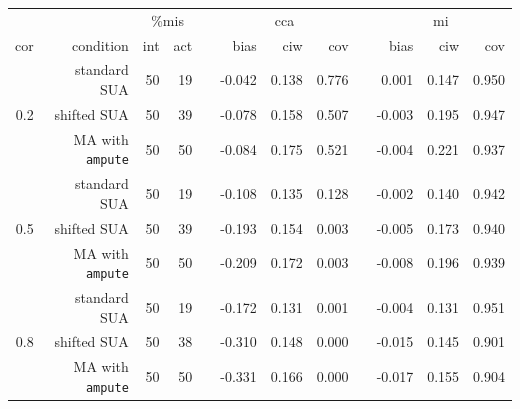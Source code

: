 \documentclass[11pt,a4paper]{article}
\newcommand{\code}[1]{\texttt{#1}}
\begin{document}
\begin{table}[h!]
\bigskip
\begin{subtable}{1\textwidth}
\centering
\captionsetup{justification=justified,singlelinecheck=false,width = 0.93\textwidth}
  \label{sim2c}
\begin{tabular}{rrrrrrrrrrrr}
  \hline
&& \multicolumn{2}{c}{\%mis} && \multicolumn{3}{c}{cca} && \multicolumn{3}{c}{mi} \\
\cline{3-4} \cline{6-8} \cline{10-12}
cor & condition & int & act & & bias & ciw & cov & & bias & ciw & cov \\ 
\hline
 & standard SUA & 50 & 19 &  & -0.042 & 0.138 & 0.776 &  & 0.001 & 0.147 & 0.950 \\ 
  0.2 & shifted SUA & 50 & 39 &  & -0.078 & 0.158 & 0.507 &  & -0.003 & 0.195 & 0.947 \\ 
   & MA with \code{ampute} & 50 & 50 &  & -0.084 & 0.175 & 0.521 &  & -0.004 & 0.221 & 0.937 \\ 
   \cline{2-12}
   & standard SUA & 50 & 19 &  & -0.108 & 0.135 & 0.128 &  & -0.002 & 0.140 & 0.942 \\ 
  0.5 & shifted SUA & 50 & 39 &  & -0.193 & 0.154 & 0.003 &  & -0.005 & 0.173 & 0.940 \\ 
   & MA with \code{ampute} & 50 & 50 &  & -0.209 & 0.172 & 0.003 &  & -0.008 & 0.196 & 0.939 \\ 
   \cline{2-12}
   & standard SUA & 50 & 19 &  & -0.172 & 0.131 & 0.001 &  & -0.004 & 0.131 & 0.951 \\ 
  0.8 & shifted SUA & 50 & 38 &  & -0.310 & 0.148 & 0.000 &  & -0.015 & 0.145 & 0.901 \\ 
   & MA with \code{ampute} & 50 & 50 &  & -0.331 & 0.166 & 0.000 &  & -0.017 & 0.155 & 0.904 \\ 
   \hline
\end{tabular}
\vspace{2mm}
\captionsetup{justification=justified,singlelinecheck=false,width = 0.93\textwidth}
  \end{subtable}
  \vspace{-3.0\baselineskip}
  \end{table}
\end{document}
